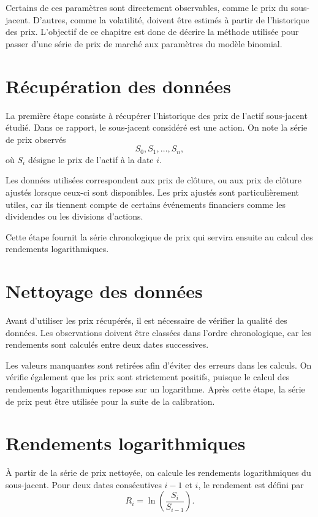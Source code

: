 \documentclass[11pt]{report}
\begin{document}
Certains de ces paramètres sont directement observables, comme le prix du sous-jacent. D'autres, comme la volatilité, doivent être estimés à partir de l'historique des prix. L'objectif de ce chapitre est donc de décrire la méthode utilisée pour passer d'une série de prix de marché aux paramètres du modèle binomial.

\section{Récupération des données}

La première étape consiste à récupérer l'historique des prix de l'actif sous-jacent étudié. Dans ce rapport, le sous-jacent considéré est une action. On note la série de prix observés
\[
S_0, S_1, \ldots, S_n,
\]
où $S_i$ désigne le prix de l'actif à la date $i$.

Les données utilisées correspondent aux prix de clôture, ou aux prix de clôture ajustés lorsque ceux-ci sont disponibles. Les prix ajustés sont particulièrement utiles, car ils tiennent compte de certains événements financiers comme les dividendes ou les divisions d'actions.

Cette étape fournit la série chronologique de prix qui servira ensuite au calcul des rendements logarithmiques.

\section{Nettoyage des données}

Avant d'utiliser les prix récupérés, il est nécessaire de vérifier la qualité des données. Les observations doivent être classées dans l'ordre chronologique, car les rendements sont calculés entre deux dates successives.

Les valeurs manquantes sont retirées afin d'éviter des erreurs dans les calculs. On vérifie également que les prix sont strictement positifs, puisque le calcul des rendements logarithmiques repose sur un logarithme. Après cette étape, la série de prix peut être utilisée pour la suite de la calibration.

\section{Rendements logarithmiques}

À partir de la série de prix nettoyée, on calcule les rendements logarithmiques du sous-jacent. Pour deux dates consécutives $i-1$ et $i$, le rendement est défini par
\[
R_i = \ln\left(\frac{S_i}{S_{i-1}}\right).
\]
\end{document}
